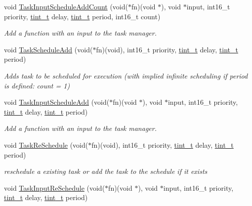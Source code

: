 \begin{DoxyCompactItemize}
void \hyperlink{group__task_gaf1cb027203da6b3f7d397601e2432570}{Task\+Input\+Schedule\+Add\+Count} (void($\ast$fn)(void $\ast$), void $\ast$input, int16\+\_\+t priority, \hyperlink{group__timing_gaef97c9386393beb1be4ed0b1513ee481}{tint\+\_\+t} delay, \hyperlink{group__timing_gaef97c9386393beb1be4ed0b1513ee481}{tint\+\_\+t} period, int16\+\_\+t count)
\begin{DoxyCompactList}\small\item\em Add a function with an input to the task manager. \end{DoxyCompactList}\item 
void \hyperlink{group__task_ga0325ea2e7cf4b65adade783e27cbb58e}{Task\+Schedule\+Add} (void($\ast$fn)(void), int16\+\_\+t priority, \hyperlink{group__timing_gaef97c9386393beb1be4ed0b1513ee481}{tint\+\_\+t} delay, \hyperlink{group__timing_gaef97c9386393beb1be4ed0b1513ee481}{tint\+\_\+t} period)
\begin{DoxyCompactList}\small\item\em Adds task to be scheduled for execution (with implied infinite scheduling if period is defined\+: count = 1) \end{DoxyCompactList}\item 
void \hyperlink{group__task_gade79a52a993e85b28a675990b3924b3d}{Task\+Input\+Schedule\+Add} (void($\ast$fn)(void $\ast$), void $\ast$input, int16\+\_\+t priority, \hyperlink{group__timing_gaef97c9386393beb1be4ed0b1513ee481}{tint\+\_\+t} delay, \hyperlink{group__timing_gaef97c9386393beb1be4ed0b1513ee481}{tint\+\_\+t} period)
\begin{DoxyCompactList}\small\item\em Add a function with an input to the task manager. \end{DoxyCompactList}\item 
void \hyperlink{group__task_ga8a9f252e20c11f74987e497fe761e805}{Task\+Re\+Schedule} (void($\ast$fn)(void), int16\+\_\+t priority, \hyperlink{group__timing_gaef97c9386393beb1be4ed0b1513ee481}{tint\+\_\+t} delay, \hyperlink{group__timing_gaef97c9386393beb1be4ed0b1513ee481}{tint\+\_\+t} period)
\begin{DoxyCompactList}\small\item\em reschedule a existing task or add the task to the schedule if it exists \end{DoxyCompactList}\item 
void \hyperlink{group__task_gac35d5fcf1636888d67f3360ee86fd6e0}{Task\+Input\+Re\+Schedule} (void($\ast$fn)(void $\ast$), void $\ast$input, int16\+\_\+t priority, \hyperlink{group__timing_gaef97c9386393beb1be4ed0b1513ee481}{tint\+\_\+t} delay, \hyperlink{group__timing_gaef97c9386393beb1be4ed0b1513ee481}{tint\+\_\+t} period)

\end{DoxyCompactItemize}
